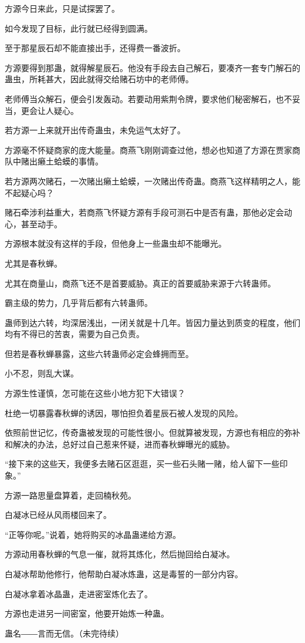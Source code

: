 \begin{this_body}
方源今日来此，只是试探罢了。

如今发现了目标，此行就已经得到圆满。

至于那星辰石却不能直接出手，还得费一番波折。

方源要得到那蛊，就得解星辰石。他没有手段去自己解石，要凑齐一套专门解石的蛊虫，所耗甚大，因此就得交给赌石坊中的老师傅。

老师傅当众解石，便会引发轰动。若要动用紫荆令牌，要求他们秘密解石，也不妥当，更会让人疑心。

若方源一上来就开出传奇蛊虫，未免运气太好了。

方源毫不怀疑商家的庞大能量。商燕飞刚刚调查过他，想必也知道了方源在贾家商队中赌出癞土蛤蟆的事情。

若方源两次赌石，一次赌出癞土蛤蟆，一次赌出传奇蛊。商燕飞这样精明之人，能不起疑心吗？

赌石牵涉利益重大，若商燕飞怀疑方源有手段可测石中是否有蛊，那他必定会动心，甚至动手。

方源根本就没有这样的手段，但他身上一些蛊虫却不能曝光。

尤其是春秋蝉。

尤其在商量山，商燕飞还不是首要威胁。真正的首要威胁来源于六转蛊师。

霸主级的势力，几乎背后都有六转蛊师。

蛊师到达六转，均深居浅出，一闭关就是十几年。皆因力量达到质变的程度，他们均有不得已的苦衷，需要为自己负责。

但若是春秋蝉暴露，这些六转蛊师必定会蜂拥而至。

小不忍，则乱大谋。

方源生性谨慎，怎可能在这些小地方犯下大错误？

杜绝一切暴露春秋蝉的诱因，哪怕担负着星辰石被人发现的风险。

依照前世记忆，传奇蛊被发现的可能性很小。但就算被发现，方源也有相应的弥补和解决的办法，总好过自己惹来怀疑，进而春秋蝉曝光的威胁。

“接下来的这些天，我便多去赌石区逛逛，买一些石头赌一赌，给人留下一些印象。”

方源一路思量盘算着，走回楠秋苑。

白凝冰已经从风雨楼回来了。

“正等你呢。”说着，她将购买的冰晶蛊递给方源。

方源动用春秋蝉的气息一催，就将其炼化，然后抛回给白凝冰。

白凝冰帮助他修行，他帮助白凝冰炼蛊，这是毒誓的一部分内容。

白凝冰拿着冰晶蛊，走进密室炼化去了。

方源也走进另一间密室，他要开始炼一种蛊。

蛊名――言而无信。（未完待续）

\end{this_body}


